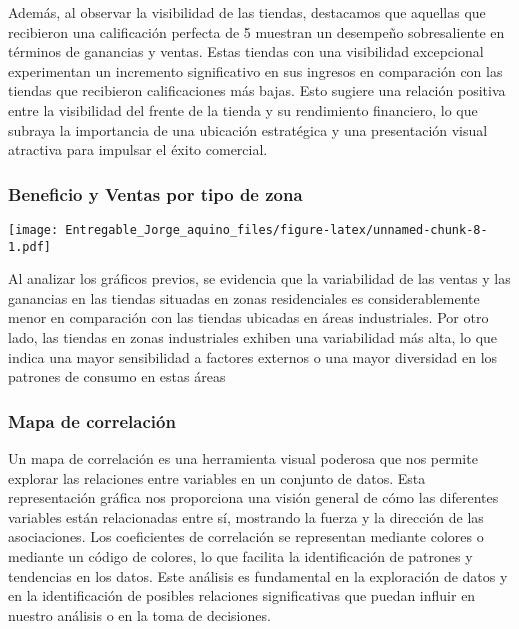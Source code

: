\documentclass[
]{article}
\begin{document}
Además, al observar la visibilidad de las tiendas, destacamos que
aquellas que recibieron una calificación perfecta de 5 muestran un
desempeño sobresaliente en términos de ganancias y ventas. Estas tiendas
con una visibilidad excepcional experimentan un incremento significativo
en sus ingresos en comparación con las tiendas que recibieron
calificaciones más bajas. Esto sugiere una relación positiva entre la
visibilidad del frente de la tienda y su rendimiento financiero, lo que
subraya la importancia de una ubicación estratégica y una presentación
visual atractiva para impulsar el éxito comercial.

\hypertarget{beneficio-y-ventas-por-tipo-de-zona}{%
\subsubsection{Beneficio y Ventas por tipo de
zona}\label{beneficio-y-ventas-por-tipo-de-zona}}

\texttt{[image: Entregable\_Jorge\_aquino\_files/figure-latex/unnamed-chunk-8-1.pdf]}

Al analizar los gráficos previos, se evidencia que la variabilidad de
las ventas y las ganancias en las tiendas situadas en zonas
residenciales es considerablemente menor en comparación con las tiendas
ubicadas en áreas industriales. Por otro lado, las tiendas en zonas
industriales exhiben una variabilidad más alta, lo que indica una mayor
sensibilidad a factores externos o una mayor diversidad en los patrones
de consumo en estas áreas

\hypertarget{mapa-de-correlaciuxf3n}{%
\subsubsection{Mapa de correlación}\label{mapa-de-correlaciuxf3n}}

Un mapa de correlación es una herramienta visual poderosa que nos
permite explorar las relaciones entre variables en un conjunto de datos.
Esta representación gráfica nos proporciona una visión general de cómo
las diferentes variables están relacionadas entre sí, mostrando la
fuerza y la dirección de las asociaciones. Los coeficientes de
correlación se representan mediante colores o mediante un código de
colores, lo que facilita la identificación de patrones y tendencias en
los datos. Este análisis es fundamental en la exploración de datos y en
la identificación de posibles relaciones significativas que puedan
influir en nuestro análisis o en la toma de decisiones.
\end{document}
